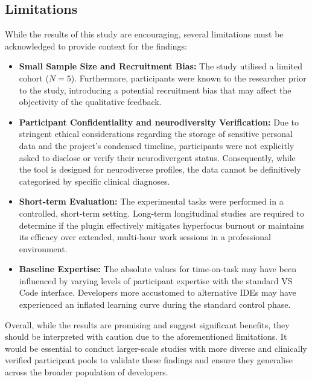 \subsection{Limitations}
While the results of this study are encouraging, several limitations must be acknowledged to provide context 
for the findings:
\begin{itemize}
    \item \textbf{Small Sample Size and Recruitment Bias:}
    The study utilised a limited cohort ($N=5$). Furthermore, participants were known to the researcher 
    prior to the study, introducing a potential recruitment bias that may affect the objectivity of the 
    qualitative feedback.
    \item \textbf{Participant Confidentiality and \Gls{neurodiversity} Verification:}
    Due to stringent ethical considerations regarding the storage of sensitive personal data and the project's
     condensed timeline, participants were not explicitly asked to disclose or verify their \gls{neurodivergent} 
     status. Consequently, while the tool is designed for \gls{neurodiverse} profiles, the data cannot be 
     definitively categorised by specific clinical diagnoses.
    \item \textbf{Short-term Evaluation:}
    The experimental tasks were performed in a controlled, short-term setting. Long-term longitudinal
     studies are required to determine if the plugin effectively mitigates \gls{hyperfocus} burnout or 
     maintains its efficacy over extended, multi-hour work sessions in a professional environment.
    \item \textbf{Baseline Expertise:}
    The absolute values for time-on-task may have been influenced by varying levels of participant expertise
     with the standard VS Code interface. Developers more accustomed to alternative \gls{IDE}s may have experienced
      an inflated learning curve during the standard control phase.
\end{itemize}

Overall, while the results are promising and suggest significant benefits, they should be interpreted with caution due to the aforementioned limitations.
It would be essential to conduct larger-scale studies with more diverse and clinically verified participant pools to validate these findings and ensure they generalise 
across the broader population of developers.

\newpage
